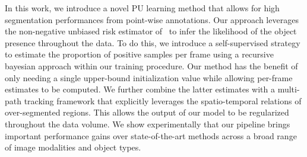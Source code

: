 In this work, we introduce a novel PU learning method that allows for high segmentation performances from point-wise annotations. Our approach leverages the non-negative unbiased risk estimator of~\cite{kiryo17} to infer the likelihood of the object presence throughout the data. To do this, we introduce a self-supervised strategy to estimate the proportion of positive samples per frame using a recursive bayesian approach within our training procedure. Our method has the benefit of only needing a single upper-bound initialization value while allowing per-frame estimates to be computed.
We further combine the latter estimates with a multi-path tracking framework that explicitly leverages the spatio-temporal relations of over-segmented regions. This allows the output of our model to be regularized throughout the data volume.
We show experimentally that our pipeline brings important performance gains over state-of-the-art methods across a broad range of image modalities and object types.


